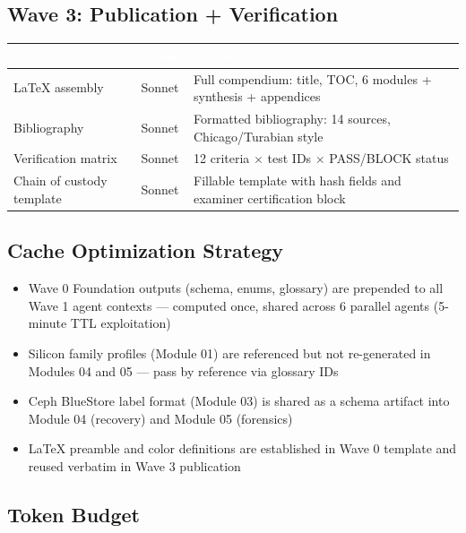 \documentclass[11pt,letterpaper]{article}
\newcommand{\tableheader}[1]{\textbf{\sffamily\textcolor{white}{#1}}}
\begin{document}
\subsection{Wave 3: Publication + Verification}

\begin{center}
\begin{tabularx}{\textwidth}{L{3.5cm}C{1.5cm}X}
\toprule
{}
\tableheader{Task} & \tableheader{Model} & \tableheader{Output} \\
\midrule
LaTeX assembly & Sonnet & Full compendium: title, TOC, 6 modules + synthesis + appendices \\
Bibliography & Sonnet & Formatted bibliography: 14 sources, Chicago/Turabian style \\
Verification matrix & Sonnet & 12 criteria $\times$ test IDs $\times$ PASS/BLOCK status \\
Chain of custody template & Sonnet & Fillable template with hash fields and examiner certification block \\
\bottomrule
\end{tabularx}
\end{center}

\subsection{Cache Optimization Strategy}

\begin{itemize}[leftmargin=*]
  \item Wave 0 Foundation outputs (schema, enums, glossary) are prepended to all Wave 1 agent contexts --- computed once, shared across 6 parallel agents (5-minute TTL exploitation)
  \item Silicon family profiles (Module 01) are referenced but not re-generated in Modules 04 and 05 --- pass by reference via glossary IDs
  \item Ceph BlueStore label format (Module 03) is shared as a schema artifact into Module 04 (recovery) and Module 05 (forensics)
  \item LaTeX preamble and color definitions are established in Wave 0 template and reused verbatim in Wave 3 publication
\end{itemize}

\subsection{Token Budget}
\end{document}
